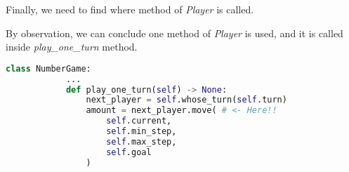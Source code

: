 \documentclass[12pt]{article}
\begin{document}
\begin{enumerate}[1.]
\begin{itemize}
        Finally, we need to find where method of \textit{Player} is
        called.

        \bigskip

        By observation, we can conclude one method of \textit{Player}
        is used, and it is called inside \textit{play\_one\_turn} method.

        \bigskip

        \begin{lstlisting}[language=Python]
        class NumberGame:
            ...
            def play_one_turn(self) -> None:
                next_player = self.whose_turn(self.turn)
                amount = next_player.move( # <- Here!!
                    self.current,
                    self.min_step,
                    self.max_step,
                    self.goal
                )
        \end{lstlisting}

    \end{itemize}













\end{enumerate}
\end{document}
